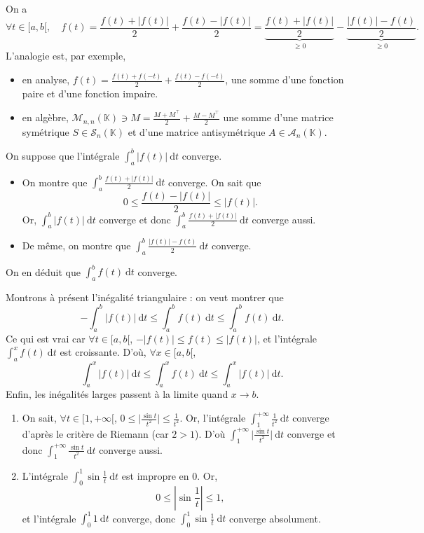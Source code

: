 \begin{prv}
	On a \[
		\forall t \in [a,b[,\quad f(t) = \frac{f(t) + |f(t)|}{2} + \frac{f(t)-|f(t)|}{2} = \underbrace{\frac{f(t) + |f(t)|}{2}}_{\ge 0} - \underbrace{\frac{|f(t)| - f(t)}{2}}_{\ge 0}
	.\]
	L'analogie est, par exemple,
	\begin{itemize}
		\item en analyse, $f(t) = \frac{f(t) + f(-t)}{2} + \frac{f(t) - f(-t)}{2}$, une somme d'une fonction paire et d'une fonction impaire.
		\item en algèbre, $\mathscr{M}_{n,n}(\mathds{K}) \owns M = \frac{M + M^\top}{2} + \frac{M - M^\top}{2}$\/ une somme d'une matrice symétrique $S \in \mathscr{S}_n(\mathds{K})$ et d'une matrice antisymétrique $A \in \mathscr{A}_n(\mathds{K})$.
	\end{itemize}

	On suppose que l'intégrale $\int_{a}^{b} |f(t)|~\mathrm{d}t$\/ converge.
	\begin{itemize}
		\item On montre que $\int_{a}^{b} \frac{f(t) + |f(t)|}{2}~\mathrm{d}t$\/ converge.
			On sait que \[
				0 \le \frac{f(t) - |f(t)|}{2} \le |f(t)|.
			\]
			Or, $\int_{a}^{b} |f(t)|~\mathrm{d}t$ converge et donc $\int_{a}^{b} \frac{f(t)+|f(t)|}{2}~\mathrm{d}t$ converge aussi.
		\item De même, on montre que $\int_{a}^{b} \frac{|f(t)|-f(t)}{2}~\mathrm{d}t$\/ converge.
	\end{itemize}
	On en déduit que $\int_{a}^{b} f(t)~\mathrm{d}t $\/ converge.

	Montrons à présent l'inégalité triangulaire : on veut montrer que \[
		-\int_{a}^{b} |f(t)|~\mathrm{d}t \le \int_{a}^{b} f(t)~\mathrm{d}t \le \int_{a}^{b} f(t)~\mathrm{d}t
	.\]
	Ce qui est vrai car $\forall t \in [a,b[$, $-|f(t)|\le f(t) \le |f(t)|$, et l'intégrale $\int_{a}^{x} f(t)~\mathrm{d}t$\/ est croissante.
	D'où, $\forall x \in [a,b[$, \[
		\int_{a}^{x} |f(t)|~\mathrm{d}t \le \int_{a}^{x} f(t)~\mathrm{d}t \le \int_{a}^{x} |f(t)|~\mathrm{d}t
	.\]
	Enfin, les inégalités larges passent à la limite quand $x \to b$.
\end{prv}

\begin{exo}
	\begin{enumerate}
		\item On sait, $\forall t \in [1,+\infty[$, $0 \le \Big| \frac{\sin t}{t^2} \Big| \le \frac{1}{t^2}$.
			Or, l'intégrale $\int_{1}^{+\infty} \frac{1}{t^2}~\mathrm{d}t$\/ converge d'après le critère de {\sc Riemann}\/ (car $2 > 1$). D'où $\int_{1}^{+\infty} \Big| \frac{\sin t}{t^2} \Big| ~\mathrm{d}t$\/ converge et donc $\int_{1}^{+\infty} \frac{\sin t}{t^2}~\mathrm{d}t$\/ converge aussi.
		\item L'intégrale $\int_{0}^{1} \sin \frac{1}{t}~\mathrm{d}t$\/ est impropre en 0. Or, \[
			0 \le \left| \sin \frac{1}{t} \right| \le 1,
		\] et l'intégrale $\int_{0}^{1} 1~\mathrm{d}t$\/ converge, donc $\int_{0}^{1} \sin \frac{1}{t}~\mathrm{d}t$\/ converge absolument.
	\end{enumerate}
\end{exo}

